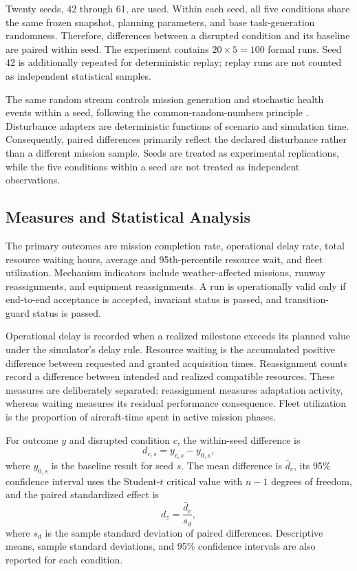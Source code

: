 \documentclass[runningheads]{llncs}
\begin{document}
Twenty seeds, 42 through 61, are used. Within each seed, all five conditions share the same frozen snapshot, planning parameters, and base task-generation randomness. Therefore, differences between a disrupted condition and its baseline are paired within seed. The experiment contains $20\times5=100$ formal runs. Seed 42 is additionally repeated for deterministic replay; replay runs are not counted as independent statistical samples.

The same random stream controls mission generation and stochastic health events within a seed, following the common-random-numbers principle \cite{heikes1976}. Disturbance adapters are deterministic functions of scenario and simulation time. Consequently, paired differences primarily reflect the declared disturbance rather than a different mission sample. Seeds are treated as experimental replications, while the five conditions within a seed are not treated as independent observations.

\subsection{Measures and Statistical Analysis}
The primary outcomes are mission completion rate, operational delay rate, total resource waiting hours, average and 95th-percentile resource wait, and fleet utilization. Mechanism indicators include weather-affected missions, runway reassignments, and equipment reassignments. A run is operationally valid only if end-to-end acceptance is accepted, invariant status is passed, and transition-guard status is passed.

Operational delay is recorded when a realized milestone exceeds its planned value under the simulator's delay rule. Resource waiting is the accumulated positive difference between requested and granted acquisition times. Reassignment counts record a difference between intended and realized compatible resources. These measures are deliberately separated: reassignment measures adaptation activity, whereas waiting measures its residual performance consequence. Fleet utilization is the proportion of aircraft-time spent in active mission phases.

For outcome $y$ and disrupted condition $c$, the within-seed difference is
\begin{equation}
 d_{c,s}=y_{c,s}-y_{0,s},
\end{equation}
where $y_{0,s}$ is the baseline result for seed $s$. The mean difference is $\bar d_c$, its 95\% confidence interval uses the Student-$t$ critical value with $n-1$ degrees of freedom, and the paired standardized effect is
\begin{equation}
 d_z=\frac{\bar d_c}{s_d},
\end{equation}
where $s_d$ is the sample standard deviation of paired differences. Descriptive means, sample standard deviations, and 95\% confidence intervals are also reported for each condition.
\end{document}
